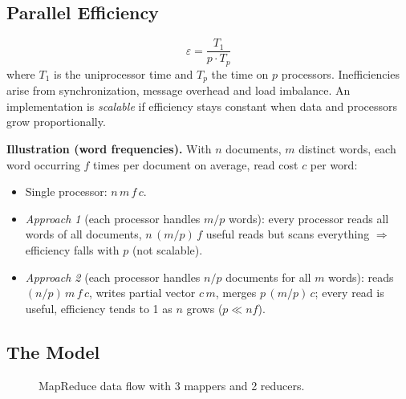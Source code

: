 \documentclass[11pt,a4paper,openany]{report}
\begin{document}
\subsection{Parallel Efficiency}
\[ \varepsilon = \frac{T_{1}}{p \cdot T_{p}} \]
where $T_1$ is the uniprocessor time and $T_p$ the time on $p$ processors. Inefficiencies arise from synchronization,
message overhead and load imbalance. An implementation is \emph{scalable} if efficiency stays constant when data and processors grow
proportionally.

\textbf{Illustration (word frequencies).} With $n$ documents, $m$ distinct words, each word occurring $f$ times per document on
average, read cost $c$ per word:
\begin{itemize}[leftmargin=*]
  \item Single processor: $n\,m\,f\,c$.
  \item \emph{Approach 1} (each processor handles $m/p$ words): every processor reads all words of all documents, $n\,(m/p)\,f$ useful
        reads but scans everything $\Rightarrow$ efficiency falls with $p$ (not scalable).
  \item \emph{Approach 2} (each processor handles $n/p$ documents for all $m$ words): reads $(n/p)\,m\,f\,c$, writes partial vector
        $c\,m$, merges $p\,(m/p)\,c$; every read is useful, efficiency tends to 1 as $n$ grows ($p \ll nf$).
\end{itemize}

\subsection{The Model}
\begin{figure}[H]
\centering
{}
\caption{MapReduce data flow with 3 mappers and 2 reducers.}
\end{figure}
\end{document}
